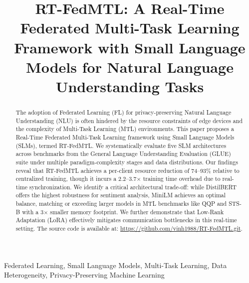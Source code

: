 \documentclass[conference]{IEEEtran}
\begin{document}
\title{RT-FedMTL: A Real-Time Federated Multi-Task Learning Framework with Small Language Models for Natural Language Understanding Tasks}

\author{
\and
{}
}

\maketitle

\begin{abstract}
The adoption of Federated Learning (FL) for privacy-preserving Natural Language Understanding (NLU) is often hindered by the resource constraints of edge devices and the complexity of Multi-Task Learning (MTL) environments. This paper proposes a Real-Time Federated Multi-Task Learning framework using Small Language Models (SLMs), termed RT-FedMTL. We systematically evaluate five SLM architectures across benchmarks from the General Language Understanding Evaluation (GLUE) suite under multiple paradigm-complexity stages and data distributions. Our findings reveal that RT-FedMTL achieves a per-client resource reduction of 74--93\% relative to centralized training, though it incurs a 2.2--3.7$\times$ training time overhead due to real-time synchronization. We identify a critical architectural trade-off: while DistilBERT offers the highest robustness for sentiment analysis, MiniLM achieves an optimal balance, matching or exceeding larger models in MTL benchmarks like QQP and STS-B with a 3$\times$ smaller memory footprint. We further demonstrate that Low-Rank Adaptation (LoRA) effectively mitigates communication bottlenecks in this real-time setting. The source code is available at: \url{https://github.com/vinh1988/RT-FedMTL.git}.
\end{abstract}

\begin{IEEEkeywords}
Federated Learning, Small Language Models, Multi-Task Learning, Data Heterogeneity, Privacy-Preserving Machine Learning
\end{IEEEkeywords}












\end{document}
